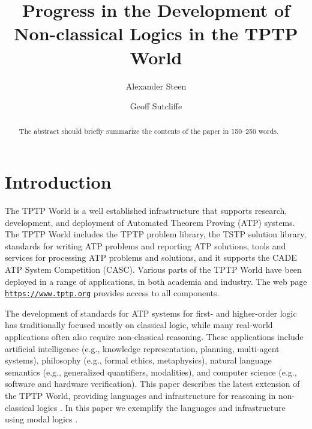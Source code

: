 \documentclass[runningheads]{llncs}
\begin{document}
\title{Progress in the Development of\\ Non-classical Logics in the TPTP World}

\author{Alexander Steen 
\and
Geoff Sutcliffe}

\maketitle
\begin{abstract}
The abstract should briefly summarize the contents of the paper in
150--250 words.

\end{abstract}
\section{Introduction}
\label{Introduction}

The TPTP World \cite{Sut17} is a well established infrastructure that supports research, 
development, and deployment of Automated Theorem Proving (ATP) systems.
The TPTP World includes the TPTP problem library,
the TSTP solution library,
standards for writing ATP problems and reporting ATP solutions,
tools and services for processing ATP problems and solutions,
and it supports the CADE ATP System Competition (CASC).
Various parts of the TPTP World have been deployed in a range of applications,
in both academia and industry.
The web page \href{https://www.tptp.org}{\tt https://www.tptp.org} provides access to all 
components.

The development of standards for ATP systems for first- and higher-order logic has traditionally 
focused mostly on classical logic, while many real-world applications often also require 
non-classical reasoning. 
These applications include artificial intelligence (e.g., knowledge representation, planning, 
multi-agent systems), philosophy (e.g., formal ethics, metaphysics), natural language semantics 
(e.g., generalized quantifiers, modalities), and computer science (e.g., software and hardware 
verification).
This paper describes the latest extension of the TPTP World, providing languages and
infrastructure for reasoning in non-classical logics \cite{Pri08,Gob01}.
In this paper we exemplify the languages and infrastructure using modal logics \cite{BBW06}.
\end{document}
